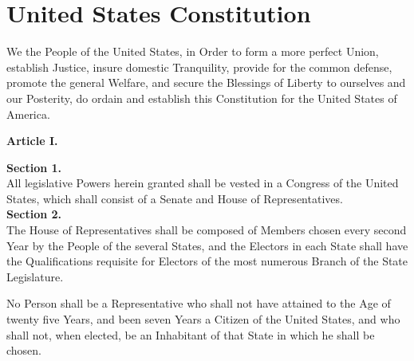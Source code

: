 %
%
%
%
%
%

\chapter{United States Constitution}


We the People of the United States, in Order to form a more perfect Union, establish Justice, insure domestic Tranquility, provide for the common defense, promote the general Welfare, and secure the Blessings of Liberty to ourselves and our Posterity, do ordain and establish this Constitution for the United States of America.\\[0.01in]

\begin{center}
{\Large \textbf{Article I.}}
\end{center}

{\large \textbf{Section 1.}}\\[0.001in]

All legislative Powers herein granted shall be vested in a Congress of the United States, which shall consist of a Senate and House of Representatives.\\[0.01in]

{\large \textbf{Section 2.}}\\[0.01in]

The House of Representatives shall be composed of Members chosen every second Year by the People of the several States, and the Electors in each State shall have the Qualifications requisite for Electors of the most numerous Branch of the State Legislature.

No Person shall be a Representative who shall not have attained to the Age of twenty five Years, and been seven Years a Citizen of the United States, and who shall not, when elected, be an Inhabitant of that State in which he shall be chosen.

